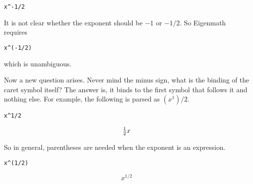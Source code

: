 \medskip
\verb$x^-1/2$

\medskip
\noindent
It is not clear whether the exponent should be $-1$ or $-1/2$.
So Eigenmath requires

\medskip
\verb$x^(-1/2)$

\medskip
\noindent
which is unambiguous.

\medskip
\noindent
Now a new question arises.
Never mind the minus sign, what is the binding of the caret symbol itself?
The answer is, it binds to the first symbol that follows it and nothing else.
For example, the following is parsed as $(x^1)/2$.

\medskip
\verb$x^1/2$

$$\hbox{$1\over2$}x$$

\medskip
\noindent
So in general, parentheses are needed when the exponent is an expression.

\medskip
\verb$x^(1/2)$

$$x^{1/2}$$

